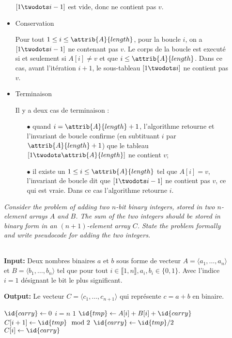 \begin{description}
\begin{ex}
\begin{itemize}
    $[1 \twodots i-1]$ est vide, donc ne contient pas $v$.
  \item Conservation

    Pour tout $1\le i\le \attrib{A}{length}$, pour la boucle $i$, on a $[1 \twodots i-1]$ ne contenant pas $v$. Le corps de la boucle est execut\'e si et seulement si $A[i] \ne v$ et que $i \le \attrib{A}{length}$. Dans ce cas, avant l'it\'eration $i+1$, le sous-tableau $[1 \twodots i]$ ne contient pas $v$.
  \item Terminaison

    Il y a deux cas de terminaison :
    \begin{itemize}
      \item[$\bullet$]  quand $i = \attrib{A}{length}+ 1$, l'algorithme retourne  et l'invariant de boucle confirme (en subtituant $i$ par $\attrib{A}{length}+1$) que le tableau $[1 \twodots \attrib{A}{length}]$ ne contient $v$;
      \item[$\bullet$] il existe un $1 \le i \le \attrib{A}{length}$ tel que $A[i] = v$, l'invariant de boucle dit que $[ 1 \twodots i-1]$ ne contient pas $v$, ce qui est vraie. Dans ce cas l'algorithme retourne $i$.
    \end{itemize}
\end{itemize}

\end{ex}

 {\itshape Consider the problem of adding two $n$-bit binary integers, stored in two $n$-element arrays $A$ and $B$. The sum of the two integers should be stored in binary form in an $(n+1)$-element array $C$.  State the problem formally and write pseudocode for adding the two integers.}

  \begin{ex}\\
    {\bfseries Input:} Deux nombres binaires $a$ et $b$ sous forme de vecteur $A = \langle a_1, \ldots, a_n \rangle$ et $B = \langle b_1, \ldots, b_n \rangle$ tel que pour tout $i \in \llbracket 1,n \rrbracket, a_i, b_i \in \{0,1\}$. Avec l'indice $i=1$ d\'esignant le bit le plus significant.

    {\bfseries Output:} Le vecteur $C = \langle c_1, \ldots, c_{n+1} \rangle$ qui repr\'esente $c = a+b$ en binaire.
    
    \begin{codebox}
      \li $\id{carry} \gets 0 $
      \li \For $i=n$ \Downto $1$ \Do
      \li $\id{tmp} \gets A[i] + B[i] + \id{carry}$
      \li $C[i+1] \gets \id{tmp} \mod 2$
      \li $\id{carry} \gets \id{tmp}/2$\End
      \li $C[i] \gets \id{carry}$
    \end{codebox}
    

\end{ex}
\end{description}
